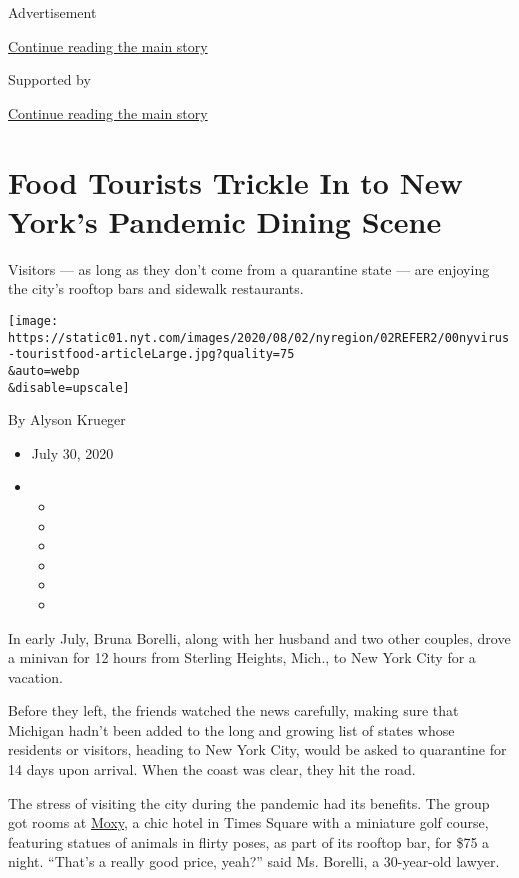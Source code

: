 Advertisement

\protect\hyperlink{after-top}{Continue reading the main story}

Supported by

\protect\hyperlink{after-sponsor}{Continue reading the main story}

\hypertarget{food-tourists-trickle-in-to-new-yorks-pandemic-dining-scene}{%
\section{Food Tourists Trickle In to New York's Pandemic Dining
Scene}\label{food-tourists-trickle-in-to-new-yorks-pandemic-dining-scene}}

Visitors --- as long as they don't come from a quarantine state --- are
enjoying the city's rooftop bars and sidewalk restaurants.

\texttt{[image: https://static01.nyt.com/images/2020/08/02/nyregion/02REFER2/00nyvirus-touristfood-articleLarge.jpg?quality=75\\\&auto=webp\\\&disable=upscale]}

By Alyson Krueger

\begin{itemize}
\item
  July 30, 2020
\item
  \begin{itemize}
  \item
  \item
  \item
  \item
  \item
  \item
  \end{itemize}
\end{itemize}

In early July, Bruna Borelli, along with her husband and two other
couples, drove a minivan for 12 hours from Sterling Heights, Mich., to
New York City for a vacation.

Before they left, the friends watched the news carefully, making sure
that Michigan hadn't been added to the long and growing list of states
whose residents or visitors, heading to New York City, would be asked to
quarantine for 14 days upon arrival. When the coast was clear, they hit
the road.

The stress of visiting the city during the pandemic had its benefits.
The group got rooms at
\href{https://www.marriott.com/hotels/travel/nycox-moxy-nyc-times-square/?scid=bb6e16b5-1692-44e9-9459-428cef21e75b\&ppc=ppc\&pId=ustbppc\&nst=paid\&gclid=EAIaIQobChMIzfqa1uvu6gIVCYvICh1WVAGtEAAYASAAEgLHAfD_BwE\&gclsrc=aw.ds}{Moxy},
a chic hotel in Times Square with a miniature golf course, featuring
statues of animals in flirty poses, as part of its rooftop bar, for \$75
a night. ``That's a really good price, yeah?'' said Ms. Borelli, a
30-year-old lawyer.

